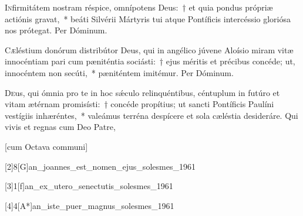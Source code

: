 \documentclass[vesperale_romanum.tex]{subfiles}
\begin{document}
\lettrine{I}{n}firmitátem nostram réspice, omnípotens Deus:~† et quia pondus própriæ actiónis gravat,~* beáti Silvérii Mártyris tui atque Pontíficis intercéssio gloriósa nos prótegat. Per Dóminum.

\myrule

\duplex

\oratio

\lettrine{C}{æ}léstium donórum distribútor Deus, qui in angélico júvene Aloísio miram vitæ innocéntiam pari cum pæniténtia sociásti:~† ejus méritis et précibus concéde; ut, innocéntem non secúti,~* pæniténtem imitémur.
Per Dóminum.


\capitdeseq
\myrule

\newpage
{}
\duplex

\oratio

\lettrine{D}{e}us, qui ómnia pro te in hoc sǽculo relinquéntibus, céntuplum in futúro et vitam ætérnam promisísti:~† concéde propítius; ut san\-cti Pontíficis Paulíni vestígiis inhæréntes,~* valeámus terréna despícere et sola cæléstia desideráre. Qui vivis et regnas cum Deo Patre,

\hicvir

\myrule



\simplex

\vespsequenti
\myrule

\newpage



[cum Octava communi]



[2]{8}[G]{an_joannes_est_nomen_ejus_solesmes_1961}

[3]{1}[f]{an_ex_utero_senectutis_solesmes_1961}
 \label{111_1f_jun_24}

[4]{4}[A*]{an_iste_puer_magnus_solesmes_1961}
\end{document}
